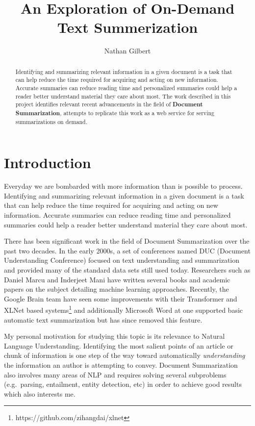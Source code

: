 \documentclass{article}
\begin{document}
\title{An Exploration of On-Demand Text Summerization}
\author{Nathan Gilbert}

\maketitle

\begin{abstract}
    Identifying and summarizing relevant information in a given document is a task
    that can help reduce the time required for acquiring and acting on new
    information. Accurate summaries can reduce reading time and personalized
    summaries could help a reader better understand material they care about most.
    The work described in this project identifies relevant recent advancements in
    the field of \textbf{Document Summarization}, attempts to replicate this work as
    a web service for serving summarizations on demand.
\end{abstract}

\section{Introduction}
Everyday we are bombarded with more information than is possible to process.
Identifying and summarizing relevant information in a given document is a task
that can help reduce the time required for acquiring and acting on new
information. Accurate summaries can reduce reading time and personalized
summaries could help a reader better understand material they care about most.

There has been significant work in the field of Document Summarization over the
past two decades. In the early 2000s, a set of conferences named DUC (Document
Understanding Conference) focused on text understanding and summarization and
provided many of the standard data sets still used today. Researchers such as
Daniel Marcu and Inderjeet Mani have written several books and academic papers
on the subject detailing machine learning approaches. Recently, the Google
Brain team have seen some improvements with their Transformer and XLNet based
systems\footnote{https://github.com/zihangdai/xlnet} and additionally Microsoft
Word at one supported basic automatic text summarization but has since removed
this feature.

My personal motivation for studying this topic is its relevance to Natural
Language Understanding. Identifying the most salient points of an article or
chunk of information is one step of the way toward automatically
\textit{understanding} the information an author is attempting to convey.
Document Summarization also involves many areas of NLP and requires solving several
subproblems (e.g.\ parsing, entailment, entity detection, etc) in order to
achieve good results which also interests me.
\end{document}
